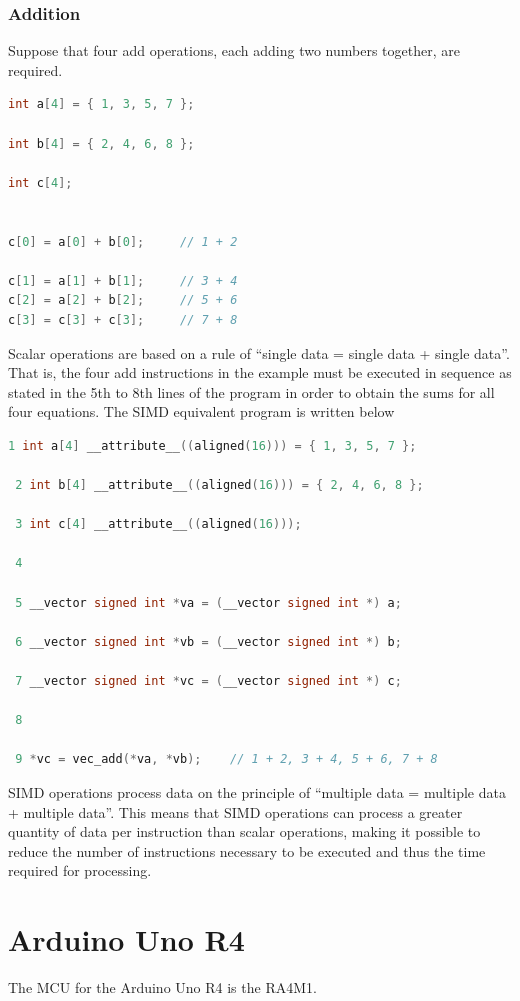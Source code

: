 \documentclass{article}
\begin{document}
\subsubsection{Addition}
Suppose that four add operations, each adding two numbers together, are required.
\begin{lstlisting}[language=C]
int a[4] = { 1, 3, 5, 7 };

int b[4] = { 2, 4, 6, 8 };

int c[4];


c[0] = a[0] + b[0];     // 1 + 2

c[1] = a[1] + b[1];     // 3 + 4
c[2] = a[2] + b[2];     // 5 + 6
c[3] = c[3] + c[3];     // 7 + 8
\end{lstlisting}
Scalar operations are based on a rule of “single data = single data + single data”. That is, the four add instructions in the example must be executed in sequence as stated in the 5th to 8th lines of the program in order to obtain the sums for all four equations. The SIMD equivalent program is written below 
\begin{lstlisting}[language=C]
 1 int a[4] __attribute__((aligned(16))) = { 1, 3, 5, 7 };

 2 int b[4] __attribute__((aligned(16))) = { 2, 4, 6, 8 };

 3 int c[4] __attribute__((aligned(16)));

 4

 5 __vector signed int *va = (__vector signed int *) a;

 6 __vector signed int *vb = (__vector signed int *) b;

 7 __vector signed int *vc = (__vector signed int *) c;

 8

 9 *vc = vec_add(*va, *vb);    // 1 + 2, 3 + 4, 5 + 6, 7 + 8    
\end{lstlisting}
SIMD operations process data on the principle of “multiple data = multiple data + multiple data”. This means that SIMD operations can process a greater quantity of data per instruction than scalar operations, making it possible to reduce the number of instructions necessary to be executed and thus the time required for processing.
\section{Arduino Uno R4}
The MCU for the Arduino Uno R4 is the RA4M1.

 
\end{document}
